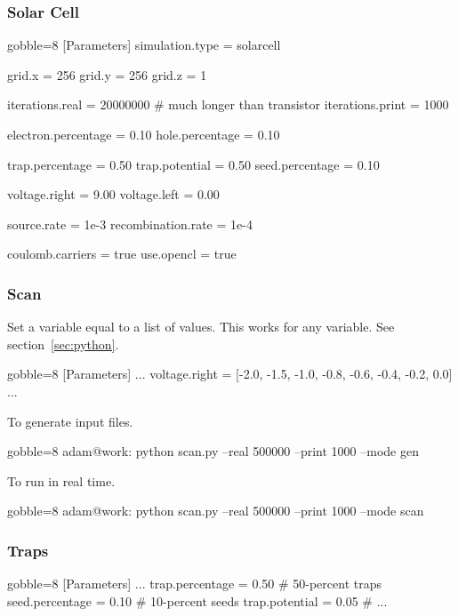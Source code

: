     \subsubsection{Solar Cell}
    \begin{bashcode*}{gobble=8}
        [Parameters]
        simulation.type         = solarcell

        grid.x                  = 256
        grid.y                  = 256
        grid.z                  = 1

        iterations.real         = 20000000  # much longer than transistor
        iterations.print        = 1000

        electron.percentage     = 0.10
        hole.percentage         = 0.10

        trap.percentage         = 0.50
        trap.potential          = 0.50
        seed.percentage         = 0.10

        voltage.right           = 9.00
        voltage.left            = 0.00

        source.rate             = 1e-3
        recombination.rate      = 1e-4

        coulomb.carriers        = true
        use.opencl              = true
    \end{bashcode*}

    \newpage
    \subsubsection{Scan}
    Set a variable equal to a list of values.  This works for any variable.
    See section~\ref{sec:python}.
    \begin{bashcode*}{gobble=8}
        [Parameters]
        ...
        voltage.right = [-2.0, -1.5, -1.0, -0.8, -0.6, -0.4, -0.2, 0.0]
        ...
    \end{bashcode*}   
    To generate input files.
    \begin{bashcode*}{gobble=8}
        adam@work: python scan.py --real 500000 --print 1000 --mode gen
    \end{bashcode*}
    To run \Langmuir in real time.
    \begin{bashcode*}{gobble=8}
        adam@work: python scan.py --real 500000 --print 1000 --mode scan
    \end{bashcode*}
    
    \subsubsection{Traps}
    \begin{bashcode*}{gobble=8}
        [Parameters]
        ...
        trap.percentage         = 0.50 # 50-percent traps
        seed.percentage         = 0.10 # 10-percent seeds
        trap.potential          = 0.05 #
        ...
    \end{bashcode*} 

